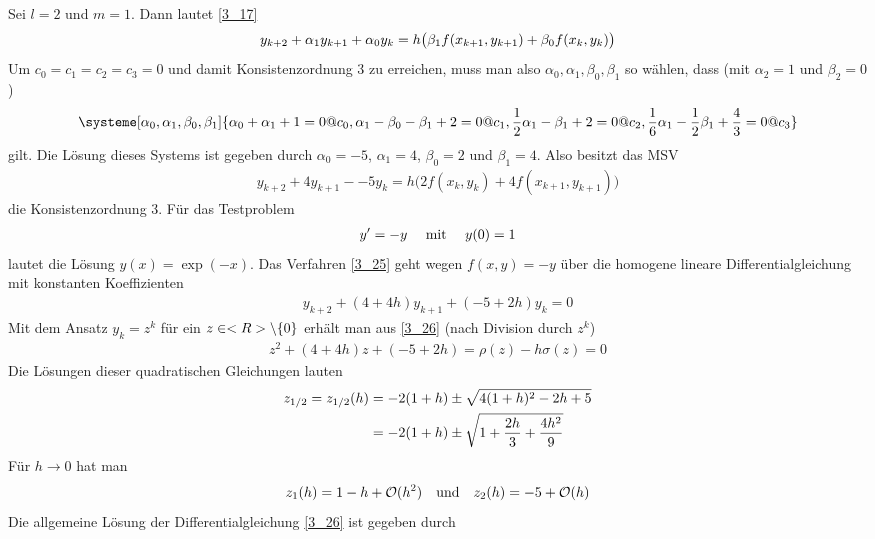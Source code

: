 \begin{example}
	Sei $l=2$ und $m=1$. Dann lautet \cref{3_17}
	\begin{align}
		y_{k+2} + \alpha_1y_{k+1} + \alpha_0y_k = h\big(\beta_1 f(x_{k+1},y_{k+1}) + \beta_0 f(x_k,y_k)\big) \notag
	\end{align}
	Um $c_0=c_1=c_2=c_3=0$ und damit Konsistenzordnung 3 zu erreichen, muss man also $\alpha_0,\alpha_1,\beta_0,\beta_1$ so wählen, dass (mit $\alpha_2=1$ und $\beta_2=0$)
	\begin{align}
		\systeme[\alpha_0,\alpha_1,\beta_0,\beta_1]{\alpha_0 + \alpha_1 + 1 = 0@c_0,\alpha_1 - \beta_0 - \beta_1 + 2 = 0@c_1, \frac{1}{2}\alpha_1 - \beta_1 + 2 = 0@c_2, \frac{1}{6}\alpha_1 - \frac{1}{2}\beta_1 + \frac{4}{3} = 0@c_3} \notag
	\end{align}
	gilt. Die Lösung dieses Systems ist gegeben durch $\alpha_0=-5$, $\alpha_1=4$, $\beta_0=2$ und $\beta_1=4$. Also besitzt das MSV
	\begin{align}
		\label{3_25}
		y_{k+2} + 4y_{k+1} - -5y_k = h\big(2f(x_k,y_k) + 4f(x_{k+1},y_{k+1})\big)
	\end{align}
	die Konsistenzordnung 3. Für das Testproblem
	\begin{align}
		y'=-y\quad\mit\quad y(0)=1 \notag
	\end{align}
	lautet die Lösung $y(x)=\exp(-x)$. Das Verfahren \cref{3_25} geht wegen $f(x,y)=-y$ über die homogene lineare Differentialgleichung mit konstanten Koeffizienten
	\begin{align}
		\label{3_26}
		y_{k+2} + (4+4h)y_{k+1} + (-5+2h)y_k=0
	\end{align}
	Mit dem Ansatz $y_k=z^k$ für ein $z\in\R\backslash\{0\}$ erhält man aus \cref{3_26} (nach Division durch $z^k$)
	\begin{align}
		\label{3_27}
		z^2 + (4+4h)z + (-5+2h) = \rho(z) - h\sigma(z) = 0
	\end{align}
	Die Lösungen dieser quadratischen Gleichungen lauten
	\begin{align}
		z_{1/2} = z_{1/2}(h) &= -2(1+h) \pm \sqrt{4(1+h)^2 - 2h+5} \notag \\
		&= -2(1+h) \pm\sqrt{1 + \frac{2h}{3} + \frac{4h^2}{9}} \notag
	\end{align}
	Für $h\to 0$ hat man
	\begin{align}
		z_1(h) = 1-h + \mathcal{O}(h^2)\quad\text{und}\quad z_2(h) = -5 + \mathcal{O}(h) \notag
	\end{align}
	Die allgemeine Lösung der Differentialgleichung \cref{3_26} ist gegeben durch

\end{example}
